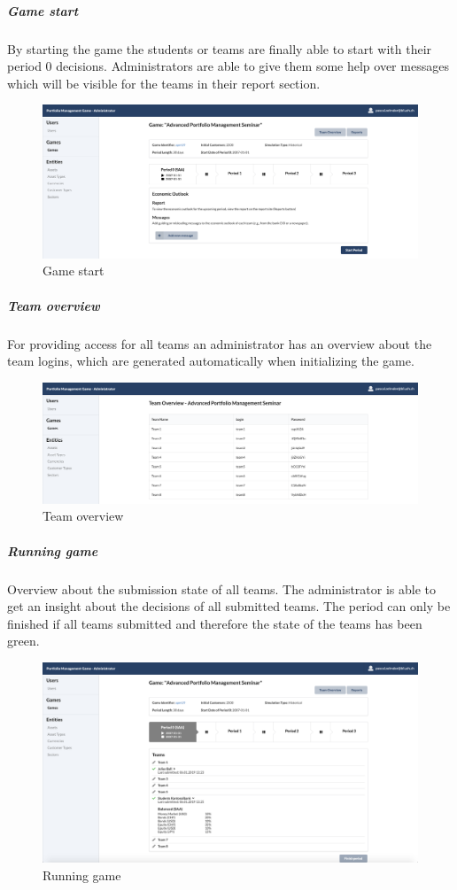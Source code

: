 \subparagraph{Game start}
By starting the game the students or teams are finally able to start with their period 0 decisions. Administrators are able to give them some help over messages which will be visible for the teams in their report section.
\begin{figure}[h!]
  \centering
  \includegraphics[scale=0.2]{img/application-overview/administrator/05_game_start.png}
  \caption{Game start}
\end{figure}


\subparagraph{Team overview}
\label{subparagraph:team_overview}
For providing access for all teams an administrator has an overview about the team logins, which are generated automatically when initializing the game.
\begin{figure}[h!]
  \centering
  \includegraphics[scale=0.2]{img/application-overview/administrator/06_team_login_overview.png}
  \caption{Team overview}
\end{figure}

\subparagraph{Running game}
Overview about the submission state of all teams. The administrator is able to get an insight about the decisions of all submitted teams. The period can only be finished if all teams submitted and therefore the state of the teams has been green.
\begin{figure}[h!]
  \centering
  \includegraphics[scale=0.2]{img/application-overview/administrator/07_running_game.png}
  \caption{Running game}
\end{figure}

